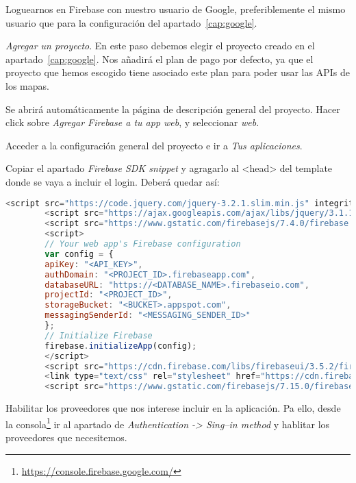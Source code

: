 \begin{steps}
	\item Loguearnos en Firebase con nuestro usuario de Google, preferiblemente el mismo usuario que para la configuración del apartado~\ref{cap:google}.
	\item \textit{Agregar un proyecto}. En este paso debemos elegir el proyecto creado en el apartado~\ref{cap:google}. Nos añadirá el plan de pago por defecto, ya que el proyecto que hemos escogido tiene asociado este plan para poder usar las APIs de los mapas.
	\item Se abrirá automáticamente la página de descripción general del proyecto. Hacer click sobre \textit{Agregar Firebase a tu app web}, y seleccionar \textit{web}.
	\item Acceder a la configuración general del proyecto e ir a \textit{Tus aplicaciones}.
	\item Copiar el apartado \textit{Firebase SDK snippet} y agragarlo al <head> del template donde se vaya a incluir el login. Deberá quedar así:
		\renewcommand{\lstlistingname}{Configuración de Firebase}
		\renewcommand{\lstlistlistingname}{List of \lstlistingname s}
		\begin{lstlisting}[language=javascript,caption={Ejemplo}]
		<script src="https://code.jquery.com/jquery-3.2.1.slim.min.js" integrity="sha384-KJ3o2DKtIkvYIK3UENzmM7KCkRr/rE9/Qpg6aAZGJwFDMVNA/GpGFF93hXpG5KkN" crossorigin="anonymous"></script>
		<script src="https://ajax.googleapis.com/ajax/libs/jquery/3.1.1/jquery.min.js"></script>
		<script src="https://www.gstatic.com/firebasejs/7.4.0/firebase.js"></script>
		<script>
		// Your web app's Firebase configuration
		var config = {
		apiKey: "<API_KEY>",
		authDomain: "<PROJECT_ID>.firebaseapp.com",
		databaseURL: "https://<DATABASE_NAME>.firebaseio.com",
		projectId: "<PROJECT_ID>",
		storageBucket: "<BUCKET>.appspot.com",
		messagingSenderId: "<MESSAGING_SENDER_ID>"
		};
		// Initialize Firebase
		firebase.initializeApp(config);
		</script>
		<script src="https://cdn.firebase.com/libs/firebaseui/3.5.2/firebaseui.js"></script>
		<link type="text/css" rel="stylesheet" href="https://cdn.firebase.com/libs/firebaseui/3.5.2/firebaseui.css" />
		<script src="https://www.gstatic.com/firebasejs/7.15.0/firebase-auth.js"></script>
		\end{lstlisting}
	\item Habilitar los proveedores que nos interese incluir en la aplicación. Pa ello, desde la consola\footnote{\url{https://console.firebase.google.com/}} ir al apartado de \textit{Authentication -> Sing--in method} y hablitar los proveedores que necesitemos.

\end{steps}
